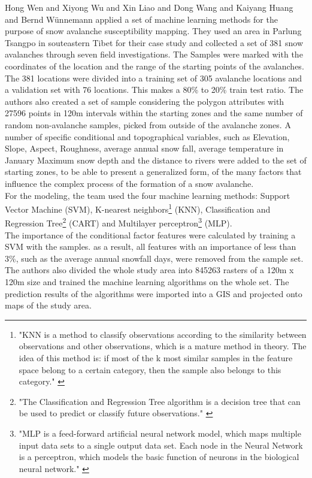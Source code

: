 \documentclass[../masterarbeit.tex]{subfiles}
\begin{document}
Hong Wen and Xiyong Wu and Xin Liao and Dong Wang and Kaiyang Huang and Bernd Wünnemann \textcite[]{WEN2022103535} applied a set of machine learning methods for the purpose of snow avalanche susceptibility mapping. They used an area in Parlung Tsangpo in souteastern Tibet for their case study and collected a set of 381 snow avalanches through seven field investigations. The Samples were marked with the coordinates of the location and the range  of the starting points of the avalanches. 
The 381 locations were divided into a training set of 305 avalanche locations and a validation set with 76 locations. This makes a 80\% to 20\% train test ratio.
The authors also created a set of sample considering the polygon attributes with 27596 points in 120m intervals within the starting zones and the same number of random non-avalanche samples, picked from outside of the avalanche zones. 
A number of specific conditional and topographical variables, such as Elevation, Slope, Aspect, Roughness, average annual snow fall, average temperature in January Maximum snow depth and the distance to rivers were added to the set of starting zones, to be able to present a generalized form, of the many factors that influence the complex process of the formation of a snow avalanche. \autocite[]{WEN2022103535} \\
For the modeling, the team used the four machine learning methods: Support Vector Machine (SVM), K-nearest neighbors\footnote{"KNN is a method to classify observations according to the similarity between observations and other observations, which is a mature method in theory. The idea of this method is: if most of the k most similar samples in the feature space belong to a certain category, then the sample also belongs to this category." \autocite[]{WEN2022103535} } (KNN), Classification and Regression Tree\footnote{"The Classification and Regression Tree algorithm is a decision tree that can be used to predict or classify future observations." \autocite[]{WEN2022103535} } (CART) and  Multilayer perceptron\footnote{"MLP is a feed-forward artificial neural network model, which maps multiple input data sets to a single output data set. Each node in the Neural Network is a perceptron, which models the basic function of neurons in the biological neural network." \autocite[]{WEN2022103535} } (MLP). \autocite[]{WEN2022103535} \\
The importance of the conditional factor features were calculated by training a SVM with the samples. as a result, all features with an importance of less than 3\%, such as the average annual snowfall days, were removed from the sample set. The authors also divided the whole study area into 845263 rasters of a 120m x 120m size and trained the machine learning algorithms on the whole set. The prediction results of the algorithms were imported into a GIS and projected onto maps of the study area. \autocite[]{WEN2022103535} \\
\end{document}
